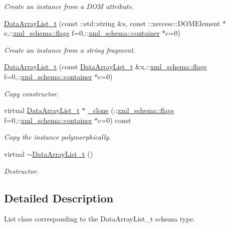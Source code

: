 \begin{DoxyCompactItemize}
\begin{DoxyCompactList}\small\item\em Create an instance from a D\+O\+M attribute. \end{DoxyCompactList}\item 
\hyperlink{classDataArrayList__t_a360a3281299fcb02ad34ad0b2c2d15fd}{Data\+Array\+List\+\_\+t} (const \+::std\+::string \&s, const \+::xercesc\+::\+D\+O\+M\+Element $\ast$e,\+::\hyperlink{namespacexml__schema_a8d981c127a1f5106d04ad5853e707361}{xml\+\_\+schema\+::flags} f=0,\+::\hyperlink{namespacexml__schema_a395f5179c5fc4643909d66e9ff28d8ca}{xml\+\_\+schema\+::container} $\ast$c=0)
\begin{DoxyCompactList}\small\item\em Create an instance from a string fragment. \end{DoxyCompactList}\item 
\hyperlink{classDataArrayList__t_af44b66e9ba5c6f84a3a0cca1c0fc98dc}{Data\+Array\+List\+\_\+t} (const \hyperlink{classDataArrayList__t}{Data\+Array\+List\+\_\+t} \&x,\+::\hyperlink{namespacexml__schema_a8d981c127a1f5106d04ad5853e707361}{xml\+\_\+schema\+::flags} f=0,\+::\hyperlink{namespacexml__schema_a395f5179c5fc4643909d66e9ff28d8ca}{xml\+\_\+schema\+::container} $\ast$c=0)
\begin{DoxyCompactList}\small\item\em Copy constructor. \end{DoxyCompactList}\item 
virtual \hyperlink{classDataArrayList__t}{Data\+Array\+List\+\_\+t} $\ast$ \hyperlink{classDataArrayList__t_acec29e88488ded1352c5b064827f5c38}{\+\_\+clone} (\+::\hyperlink{namespacexml__schema_a8d981c127a1f5106d04ad5853e707361}{xml\+\_\+schema\+::flags} f=0,\+::\hyperlink{namespacexml__schema_a395f5179c5fc4643909d66e9ff28d8ca}{xml\+\_\+schema\+::container} $\ast$c=0) const 
\begin{DoxyCompactList}\small\item\em Copy the instance polymorphically. \end{DoxyCompactList}\item 
virtual \hyperlink{classDataArrayList__t_aee3c16237122c72a9c163847232d830f}{$\sim$\+Data\+Array\+List\+\_\+t} ()
\begin{DoxyCompactList}\small\item\em Destructor. \end{DoxyCompactList}\end{DoxyCompactItemize}


\subsection{Detailed Description}
List class corresponding to the Data\+Array\+List\+\_\+t schema type. 

